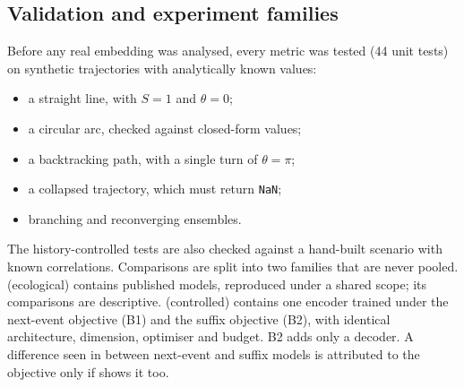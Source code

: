 \subsection{Validation and experiment families}\label{sec:method-families}
Before any real embedding was analysed, every metric was tested (44 unit
tests) on synthetic trajectories with analytically known values:
\begin{itemize}[leftmargin=1.2em,itemsep=0pt,topsep=1pt]
  \item a straight line, with $S=1$ and $\theta=0$;
  \item a circular arc, checked against closed-form values;
  \item a backtracking path, with a single turn of $\theta=\pi$;
  \item a collapsed trajectory, which must return \texttt{NaN};
  \item branching and reconverging ensembles.
\end{itemize}
The history-controlled tests are also checked against a hand-built scenario
with known correlations. Comparisons are split into two families that are
never pooled. \famA (ecological) contains published models, reproduced under
a shared scope; its comparisons are descriptive. \famB (controlled) contains
one encoder trained under the next-event objective (B1) and the suffix
objective (B2), with identical architecture, dimension, optimiser and budget.
B2 adds only a decoder. A difference seen in \famA between next-event and
suffix models is attributed to the objective only if \famB shows it too.

